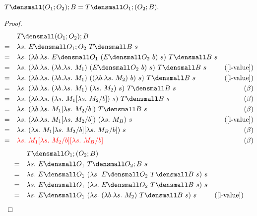 \begin{theorem}

    $ T\den{(O_1;O_2);B} = T\den{O_1;(O_2;B)}.$
    \begin{proof}
        \begin{align*}
            &\quad T\den{(O_1;O_2);B} \\
            =& \quad \lambda s.~ E\den{O_1;O_2} ~T\den{B} ~s \\
            =& \quad \lambda s.~ (\lambda b. \lambda s.~ E\den{O_1} ~(E\den{O_2} ~b) ~s) ~T\den{B} ~s \\
            =& \quad \lambda s.~ (\lambda b. \lambda s.~ (\lambda b. \lambda s.~ M_1) ~(E\den{O_2} ~b) ~s) ~T\den{B} ~s & (\cref{l-value})\\
            =& \quad \lambda s.~ (\lambda b. \lambda s.~ (\lambda b. \lambda s.~ M_1) ~((\lambda b. \lambda s.~ M_2) ~b) ~s) ~T\den{B} ~s & (\cref{l-value})\\
            =& \quad \lambda s.~ (\lambda b. \lambda s.~ (\lambda b. \lambda s.~ M_1) ~(\lambda s.~ M_2) ~s) ~T\den{B} ~s & (\beta)\\
            =& \quad \lambda s.~ (\lambda b. \lambda s.~ (\lambda s.~ M_1\subst{b}{\lambda s.~ M_2}) ~s) ~T\den{B} ~s & (\beta)\\
            =& \quad \lambda s.~ (\lambda b. \lambda s.~ M_1\subst{b}{\lambda s.~ M_2}) ~T\den{B} ~s & (\beta)\\
            =& \quad \lambda s.~ (\lambda b. \lambda s.~ M_1\subst{b}{\lambda s.~ M_2}) ~(\lambda s.~ M_B) ~s & (\cref{l-value})\\
            =& \quad \lambda s.~ (\lambda s.~ M_1\subst{b}{\lambda s.~ M_2}\subst{b}{\lambda s.~ M_B}) ~s & (\beta)\\
            =& \quad \color{red}{\lambda s.~ M_1\subst{b}{\lambda s.~ M_2}\subst{b}{\lambda s.~ M_B}} & (\beta)
        \end{align*}
        \begin{align*}
            &\quad T\den{O_1;(O_2;B)} \\
            =& \quad \lambda s.~ E\den{O_1} ~T\den{O_2;B} ~s \\
            =& \quad \lambda s.~ E\den{O_1} ~(\lambda s. ~E\den{O_2} ~T\den{B} ~s) ~s \\
            =& \quad \lambda s.~ E\den{O_1} ~(\lambda s. ~E\den{O_2} ~T\den{B} ~s) ~s \\
            =& \quad \lambda s.~ E\den{O_1} ~(\lambda s. ~(\lambda b. \lambda s.~ M_2) ~T\den{B} ~s) ~s & (\cref{l-value})\\

\end{align*}
\end{proof}
\end{theorem}
